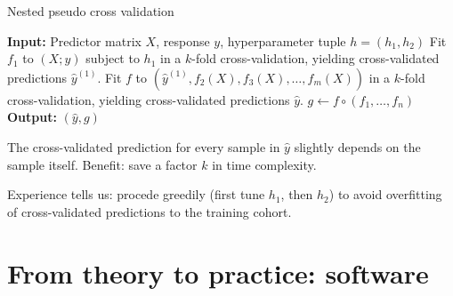\documentclass[10pt, aspectratio=169]{beamer}
\begin{document}
\begin{frame}{}
  \begin{algorithm}[H]
    \caption{Nested pseudo cross validation} \label{alg:nested-pcv}
    \begin{algorithmic}[1]
      \State \textbf{Input:} Predictor matrix $X$, response $y$, 
        hyperparameter tuple $h = (h_1, h_2)$
      \State Fit $f_1$ to $(X; y)$ subject to $h_1$ in a $k$-fold cross-validation, 
        yielding cross-validated predictions $\hat{y}^{(1)}$.
      \State Fit $f$ to $(\hat{y}^{(1)}, f_2(X), f_3(X), \ldots, f_m(X))$ in a $k$-fold 
        cross-validation, yielding cross-validated predictions $\hat{y}$.
      \State $g \gets f \circ (f_1, \ldots, f_n)$
      \State \textbf{Output:} $(\hat{y}, g)$
    \end{algorithmic}
  \end{algorithm}

\pause
The  cross-validated prediction for every sample in $\hat{y}$ slightly 
depends on the sample itself. Benefit: save a factor $k$ in time complexity.

\pause
Experience tells us: procede greedily (first tune $h_1$, then $h_2$) to avoid 
overfitting of cross-validated predictions to the training cohort.
\end{frame}

\section{From theory to practice: software}
\end{document}
